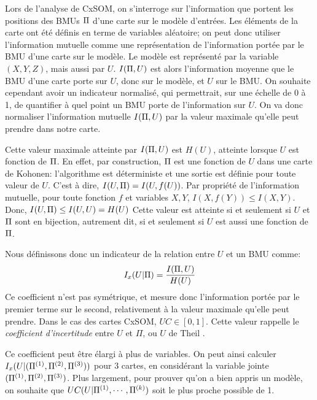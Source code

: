 Lors de l'analyse de CxSOM, on s'interroge sur l'information que portent les positions des BMUs $\Pi$ d'une carte sur le modèle d'entrées. Les éléments de la carte ont été définis en terme de variables aléatoire; on peut donc utiliser l'information mutuelle comme une représentation de l'information portée par le BMU d'une carte sur le modèle. Le modèle est représenté par la variable $(X,Y,Z)$, mais aussi par $U$. $I(\Pi, U)$ est alors l'information moyenne que le BMU d'une carte porte sur $U$, donc sur le modèle, et $U$ sur le BMU. On souhaite cependant avoir un indicateur normalisé, qui permettrait, sur une échelle de 0 à 1, de quantifier à quel point un BMU porte de l'information sur $U$. On va donc normaliser l'information mutuelle $I(\Pi,U)$ par la valeur maximale qu'elle peut prendre dans notre carte.


Cette valeur maximale atteinte par $I(\Pi,U)$ est $H(U)$, atteinte lorsque $U$ est fonction de $\Pi$.
En effet, par construction, $\Pi$ est une fonction de $U$ dans une carte de Kohonen: l'algorithme est déterministe et une sortie est définie pour toute valeur de $U$. C'est à dire, $I(U,\Pi) = I (U, f(U))$.
Par propriété de l'information mutuelle, pour toute fonction $f$ et variables $X,Y$, $I(X,f(Y)) \leq I(X,Y) $. 
Donc, $I(U,\Pi) \leq I(U,U) = H(U)$
Cette valeur est atteinte si et seulement si $U$ et $\Pi$ sont en bijection, autrement dit, si et seulement si $U$ est aussi une fonction de $\Pi$.


Nous définissons donc un indicateur de la relation entre $U$ et un BMU comme:
\begin{equation}
I_x(U|\Pi) = \frac{I(\Pi,U)}{H(U)}
\end{equation}
Ce coefficient n'est pas symétrique, et mesure donc l'information portée par le premier terme sur le second, relativement à la valeur maximale qu'elle peut prendre. Dans le cas des cartes CxSOM, $UC \in [0,1]$. Cette valeur rappelle le \emph{coefficient d'incertitude} entre $U$ et $\Pi$, ou $U$ de Theil \cite{Theil1961EconomicFA}.


 
Ce coefficient peut être élargi à plus de variables. On peut ainsi calculer $I_x(U | (\Pi^{({1})},\Pi^{({2})},\Pi^{({3})}))$ pour 3 cartes, en considérant la variable jointe $(\Pi^{({1})},\Pi^{({2})},\Pi^{({3})})$. Plus largement, pour prouver qu'on a bien appris un modèle, on souhaite que $UC(U|\Pi^{({1})},\cdots,\Pi^{({k})})$ soit le plus proche possible de 1.


